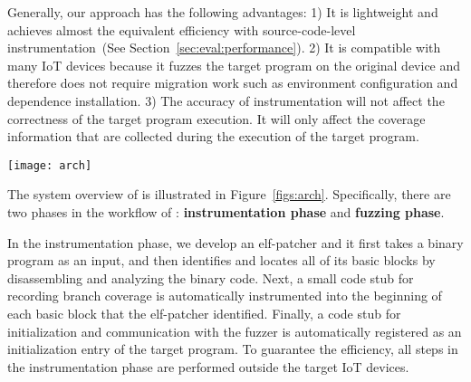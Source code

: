 




Generally, our approach has the following advantages: 1) It is lightweight and achieves almost the equivalent efficiency with source-code-level instrumentation~(See Section~\ref{sec:eval:performance}). 2) It is compatible with many IoT devices because it fuzzes the target program on the original device and therefore does not require migration work such as environment configuration and dependence installation. 3) The accuracy of instrumentation will not affect the correctness of the target program execution. It will only affect the coverage information that are collected during the execution of the target program.



\begin{figure*}[htbp]
\centering 
\texttt{[image: arch]}
\caption{ Overview of \sysname.}
\label{figs:arch}
\end{figure*}

The system overview of {\sysname} is illustrated in Figure~\ref{figs:arch}. Specifically, there are two phases in the workflow of \sysname: \textbf{instrumentation phase} and \textbf{fuzzing phase}.

In the instrumentation phase, we develop an elf-patcher and it first takes a binary program as an input, and then identifies and locates all of its basic blocks by disassembling and analyzing the binary code. Next, a small code stub for recording branch coverage is automatically instrumented into the beginning of each basic block that the elf-patcher identified. Finally, a code stub for initialization and communication with the fuzzer is automatically registered as an initialization entry of the target program. To guarantee the efficiency, all steps in the instrumentation phase are performed outside the target IoT devices. 

